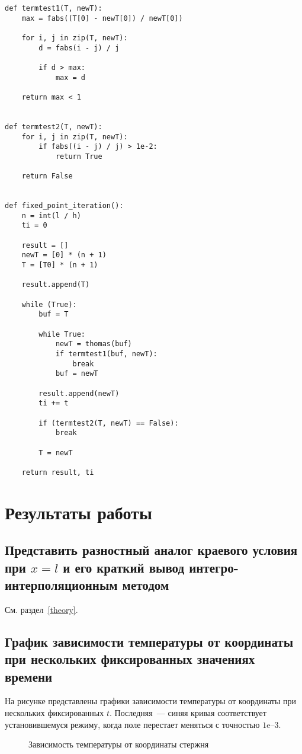 \begin{lstlisting}[caption={Метод простых итераций}]
def termtest1(T, newT):
    max = fabs((T[0] - newT[0]) / newT[0])

    for i, j in zip(T, newT):
        d = fabs(i - j) / j

        if d > max:
            max = d

    return max < 1


def termtest2(T, newT):
    for i, j in zip(T, newT):
        if fabs((i - j) / j) > 1e-2:
            return True

    return False


def fixed_point_iteration():
    n = int(l / h)
    ti = 0

    result = []
    newT = [0] * (n + 1)
    T = [T0] * (n + 1)

    result.append(T)

    while (True):
        buf = T

        while True:
            newT = thomas(buf)
            if termtest1(buf, newT):
                break
            buf = newT

        result.append(newT)
        ti += t

        if (termtest2(T, newT) == False):
            break

        T = newT

    return result, ti
\end{lstlisting}

\section{Результаты работы}

\subsection{Представить разностный аналог краевого условия при $x = l$ и его краткий вывод интегро-интерполяционным методом}
См. раздел~\ref{theory}.

\subsection{График зависимости температуры от координаты при нескольких фиксированных значениях времени}
На рисунке представлены графики зависимости температуры от координаты при нескольких фиксированных $t$. Последняя~--- синяя кривая соответствует установившемуся режиму, когда поле перестает меняться с точностью $1\text{e--}3$.
\begin{figure}[H]
    \caption{Зависимость температуры от координаты стержня}\label{img:plot01}
    
\end{figure}

